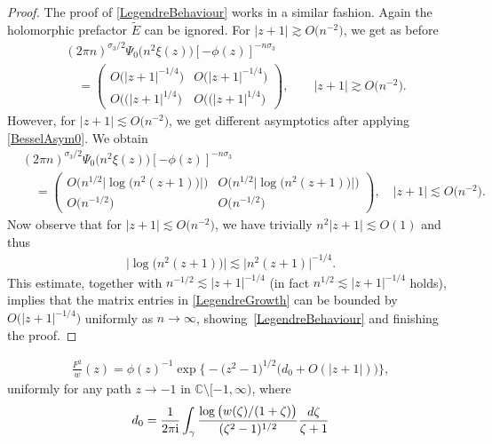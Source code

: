 \documentclass[10pt,a4paper]{amsart}
\newcommand{\C}{\mathbb{C}}
\newcommand{\I}{\mathrm{i}}
\numberwithin{equation}{section}
\begin{document}
\begin{proof}
The proof of \eqref{LegendreBehaviour} works in a similar fashion. Again the holomorphic prefactor $\widetilde E$ can be ignored. For $|z+1|\gtrsim O\big(n^{-2}\big)$, we get as before
\begin{align*}
& (2\pi n)^{\sigma_3/2}\Psi_0\big(n^2 \xi(z)\big)[-\phi(z)]^{-n\sigma_3}
 \\
 &\quad=\begin{pmatrix}
 O\big(|z+1|^{-1/4}\big) & O\big(|z+1|^{-1/4}\big)
 \\
 O\big((|z+1|^{1/4}\big) & O\big((|z+1|^{1/4}\big)
 \end{pmatrix}, \qquad |z+1| \gtrsim O\big(n^{-2}\big).
\end{align*}
However, for $|z+1|\lesssim O\big(n^{-2}\big)$, we get different asymptotics after applying \eqref{BesselAsym0}. We obtain%
\begin{align} \nonumber
 &(2\pi n)^{\sigma_3/2}\Psi_0\big(n^2 \xi(z)\big) [-\phi(z)]^{-n\sigma_3}
 \\\label{LegendreGrowth}
 &\quad= \begin{pmatrix}
 O\big(n^{1/2} \big|\log\big(n^2(z+1)\big)\big|\big) & O\big(n^{1/2} \big|\log \big(n^2(z+1)\big)\big|\big)
 \\
 O\big(n^{-1/2}\big) & O\big(n^{-1/2}\big)
 \end{pmatrix}, \quad |z+1|\lesssim O\big(n^{-2}\big).
\end{align}
Now observe that for $|z+1|\lesssim O\big(n^{-2}\big)$, we have trivially $n^2|z+1|\lesssim O(1)$ and thus
\begin{align*}
 \big|\log\big(n^2(z+1)\big)\big| \lesssim \big|n^2(z+1)\big|^{-1/4}.
\end{align*}
This estimate, together with $n^{-1/2} \lesssim |z+1|^{-1/4}$ \big(in fact $n^{1/2} \lesssim |z+1|^{-1/4}$ holds\big), implies that the matrix entries in \eqref{LegendreGrowth} can be bounded by $O\big(|z+1|^{-1/4}\big)$ uniformly as $n \to \infty$, showing~\eqref{LegendreBehaviour} and finishing the proof.
\end{proof}

\begin{align}\label{F^2/w at -1}
 \frac{F^2}{w}(z) = \phi(z)^{-1}\exp\bigl\lbrace-\big(z^2-1\big)^{1/2}\big(d_0+O(|z+1|)\big)\bigr\rbrace,
\end{align}
uniformly for any path $z\to-1$ in $\C \setminus [-1,\infty)$, where
\begin{align}\label{d0}
 d_0 = \frac{1}{2\pi\I} \int_\gamma \frac{\log\big(w(\zeta)/(1+\zeta)\big)}{(\zeta^2-1)^{1/2}}\frac{{\rm d}\zeta}{\zeta+1}
\end{align}
\end{document}
